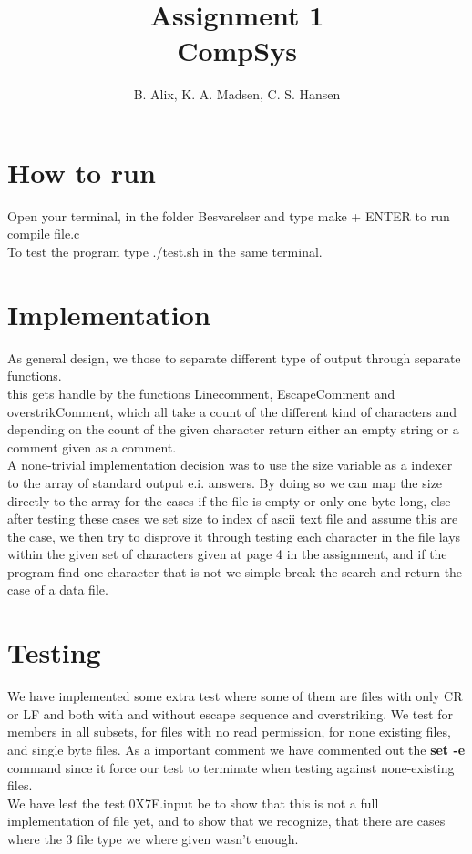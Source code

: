 \documentclass[12pt,a4paper]{article}
\author{B. Alix, K. A. Madsen, C. S. Hansen}
\title{Assignment 1 \\ CompSys}
\begin{document}
\clearpage\maketitle
\thispagestyle{empty}
\setcounter{page}{0}
\newpage

\section*{How to run}
Open your terminal, in the folder Besvarelser and type make + ENTER to run compile file.c
\\[10pt]
To test the program type ./test.sh in the same terminal.
\\[10pt]
\section*{Implementation}
As general design, we those to separate different type of output through separate functions. 
\\
this gets handle by the functions Linecomment, EscapeComment and overstrikComment, 
which all take a count of the different kind of characters and depending on the count of the given character return either an empty string or a comment given as a comment.
\\
A none-trivial implementation decision was to use the size variable as a indexer to the array of standard output e.i. answers. By doing so we can map the size directly to the array for the cases if the file is empty or only one byte long, else after testing these cases we set size to index of ascii text file and assume this are the case, we then try to disprove it through testing each character in the file lays within the given set of characters given at page 4 in the assignment, and if the program find one character that is not we simple break the search and return the case of a data file.

\section*{Testing}
We have implemented some extra test where some of them are files with only CR or LF and both with and without escape sequence and overstriking. We test for members in all subsets, for files with no read permission, for none existing files, and single byte files. As a important comment we have commented out the \textbf{set -e} command since it force our test to terminate when testing against none-existing files.
\\[10pt]
We have lest the test 0X7F.input be to show that this is not a full implementation of file yet, and to show that we recognize, that there are cases where the 3 file type we where given wasn't enough. 
\end{document}

